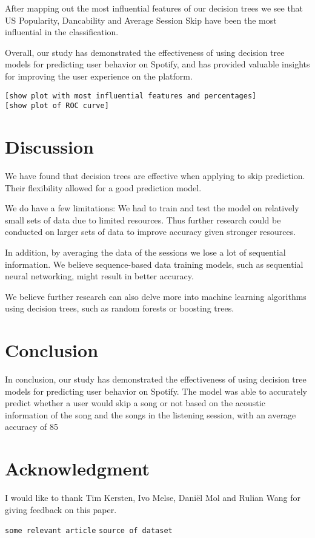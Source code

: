 \documentclass[conference]{IEEEtran}
\begin{document}
After mapping out the most influential features of our decision trees we see that US Popularity, Dancability and Average Session Skip have been the most influential in the classification.

Overall, our study has demonstrated the effectiveness of using decision tree models for predicting user behavior on Spotify, and has provided valuable insights for improving the user experience on the platform.

\verb|[show plot with most influential features and percentages]| \\
\verb|[show plot of ROC curve]| \\

\section{Discussion}
We have found that decision trees are effective when applying to skip prediction. 
Their flexibility allowed for a good prediction model.

We do have a few limitations: We had to train and test the model on relatively small sets of data due to limited resources.  
Thus further research could be conducted on larger sets of data to improve accuracy given stronger resources. 

In addition, by averaging the data of the sessions we lose a lot of sequential information. We believe sequence-based data training models, such as sequential neural networking, might result in better accuracy.

We believe further research can also delve more into machine learning algorithms using decision trees, such as random forests or boosting trees.

\section{Conclusion}
In conclusion, our study has demonstrated the effectiveness of using decision tree models for predicting user behavior on Spotify. The model was able to accurately predict whether a user would skip a song or not based on the acoustic information of the song and the songs in the listening session, with an average accuracy of 85%

\section*{Acknowledgment}
I would like to thank Tim Kersten, Ivo Melse, Dani\"{e}l Mol and Rulian Wang for giving feedback on this paper.

\begin{thebibliography}{00}
 \verb|some relevant article|
 \verb|source of dataset|
\end{thebibliography}
\end{document}
